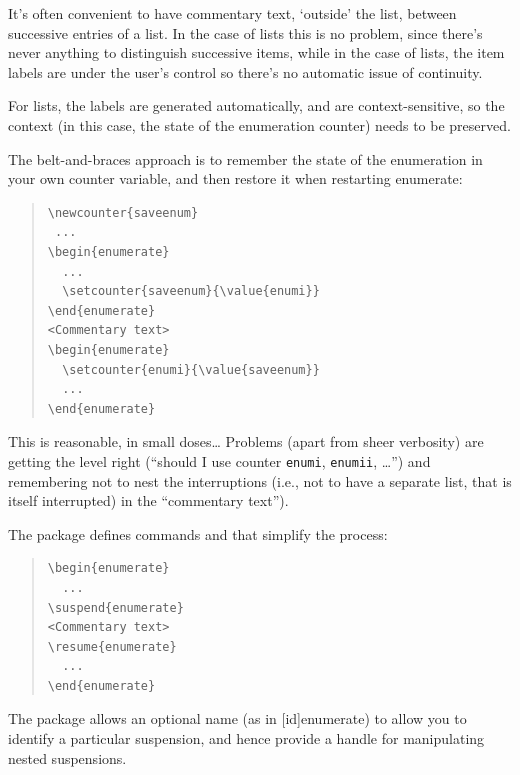 
It's often convenient to have commentary text, `outside' the list,
between successive entries of a list.  In the case of
 lists this is no problem, since there's never
anything to distinguish successive items, while in the case of
 lists, the item labels are under the user's
control so there's no automatic issue of continuity.

For  lists, the labels are generated
automatically, and are context-sensitive, so the context (in this
case, the state of the enumeration counter) needs to be preserved.

The belt-and-braces approach is to remember the state of the
enumeration in your own counter variable, and then restore it when
restarting enumerate:
\begin{quote}
\begin{verbatim}
\newcounter{saveenum}
 ...
\begin{enumerate}
  ...
  \setcounter{saveenum}{\value{enumi}}
\end{enumerate}
<Commentary text>
\begin{enumerate}
  \setcounter{enumi}{\value{saveenum}}
  ...
\end{enumerate}
\end{verbatim}
\end{quote}

This is reasonable, in small doses\dots{} Problems (apart from sheer
verbosity) are getting the level right (``should I use counter
\texttt{enumi}, \texttt{enumii}, \dots{}'') and remembering not to
nest the interruptions (i.e., not to have a separate list, that is
itself interrupted) in the ``commentary text'').

The  package defines commands  and
 that simplify the process:
\begin{quote}
\begin{verbatim}
\begin{enumerate}
  ...
\suspend{enumerate}
<Commentary text>
\resume{enumerate}
  ...
\end{enumerate}
\end{verbatim}
\end{quote}
The package allows an optional name (as in
[id]{enumerate}) to allow you to identify a
particular suspension, and hence provide a handle for manipulating
nested suspensions.

